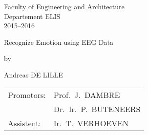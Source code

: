 

\begin{titlepage}

\setlength{\hoffset}{-1in}
\setlength{\voffset}{-1in}
\setlength{\topmargin}{1.5cm}
\setlength{\headheight}{0.5cm}
\setlength{\headsep}{1cm}
\setlength{\oddsidemargin}{3cm}
\setlength{\evensidemargin}{3cm}
\setlength{\footskip}{1.5cm}
\enlargethispage{1cm}


\fontsize{12pt}{14pt}
\selectfont

\begin{center}


\vspace{0.5cm}

Faculty of Engineering and Architecture\\
Departement ELIS\\
2015--2016 \\

\vspace{3.5cm}

\fontsize{17.28pt}{21pt}
\selectfont

Recognize Emotion using EEG Data

\fontsize{12pt}{14pt}
\selectfont

\vspace{.6cm}

by 

\vspace{.4cm}

Andreas DE LILLE

\vspace{3.5cm}


\begin{tabular}{ll}
Promotors: & Prof.~J.~DAMBRE\\
 & Dr.~Ir.~P.~BUTENEERS\\
Assistent: & Ir.~T.~VERHOEVEN\\
\end{tabular}
 

\vspace{3cm}


\end{center}
\end{titlepage}

